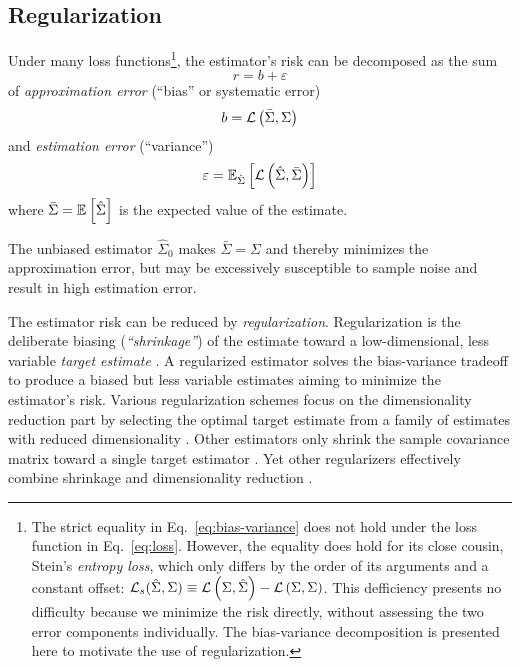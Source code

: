 \subsection*{Regularization}
Under many loss functions\footnote{
The strict equality in Eq.~\ref{eq:bias-variance} does not hold under the loss function in Eq.~\ref{eq:loss}. 
However, the equality does hold for its close cousin, Stein's \emph{entropy loss}, which only differs by the order of its arguments and a constant offset: $\mathcal L_s(\hat\Sigma,\Sigma) \equiv \loss{\Sigma,\hat\Sigma} - \loss{\Sigma,\Sigma}$. 
This defficiency presents no difficulty because we minimize the risk directly, without assessing the two error components individually. 
The bias-variance decomposition is presented here to motivate the use of regularization.}, 
the estimator's risk can be decomposed as the sum
\begin{equation}\label{eq:bias-variance}
    r = b + \varepsilon
\end{equation}
of \emph{approximation error} (``bias'' or systematic error)
\begin{equation}
   b = \loss{\bar\Sigma,\Sigma}
\end{equation}
and \emph{estimation error} (``variance'') 
\begin{equation}
   \varepsilon = \E[\hat\Sigma]{\loss{\hat\Sigma, \bar\Sigma}}
\end{equation}
where $\bar\Sigma = \E{\hat\Sigma}$ is the expected value of the estimate. 

The unbiased estimator $\hat\Sigma_0$ makes $\bar\Sigma=\Sigma$ and thereby minimizes the approximation error, but may be excessively susceptible to sample noise and result in high estimation error.

The estimator risk can be reduced by \emph{regularization}. Regularization is the deliberate biasing (\emph{``shrinkage''}) of the estimate toward a low-dimensional, less variable \emph{target estimate} \cite{Bickel:2006,Ledoit:2004}. 
A regularized estimator solves the bias-variance tradeoff to produce a biased but less variable estimates aiming to minimize the estimator's risk.  
Various regularization schemes focus on the dimensionality reduction part  by selecting the optimal target estimate from a family of estimates with reduced dimensionality \cite{findit}.  
Other estimators only shrink the sample covariance matrix toward a single target estimator \cite{Schafer:2005}. 
Yet other regularizers effectively combine shrinkage and dimensionality reduction \cite{findit}.
